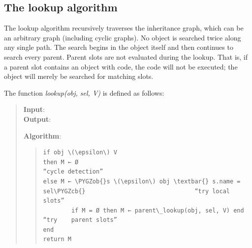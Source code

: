 \documentclass[letterpaper,10pt,english]{sphinxmanual}
\def\PYGZob{\char`\{}
\def\PYGZcb{\char`\}}
\begin{document}

\subsection{The lookup algorithm}
\label{langref:the-lookup-algorithm}\label{langref:index-55}
The lookup algorithm recursively traverses the inheritance graph, which can be an arbitrary graph (including cyclic graphs). No object is searched twice along any single path. The search begins in the object itself and then continues to search every parent. Parent slots are not evaluated during the lookup. That is, if a parent slot contains an object with code, the code will not be executed; the object will merely be searched for matching slots.

The function \emph{lookup(obj, sel, V)} is defined as follows:
\begin{quote}
\begin{description}
\item[{\textbf{Input}:}] \leavevmode
{}

\item[{\textbf{Output}:}] \leavevmode
{}

\end{description}

\textbf{Algorithm}:
\begin{quote}

\begin{Verbatim}[commandchars=\\\{\}]
if obj \(\epsilon\) V
then M ← Ø                                                      “cycle detection”
else M ← \PYGZob{}s \(\epsilon\) obj \textbar{} s.name = sel\PYGZcb{}                               “try local slots”
        if M = Ø then M ← parent\_lookup(obj, sel, V) end        “try    parent slots”
end
return M
\end{Verbatim}
\end{quote}
\end{quote}
\end{document}
